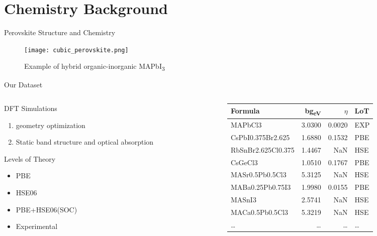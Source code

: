 \documentclass[10pt, compress]{beamer}
\begin{document}
\section{Chemistry Background}
\label{sec:org67eb681}
\begin{frame}[label={sec:orgc23004d}]{Perovskite Structure and Chemistry}
\begin{figure}[htbp]
\centering
\texttt{[image: cubic\_perovskite.png]}
\caption{Example of hybrid organic-inorganic MAPbI\textsubscript{3} \cite{mannodi-kanakkithodi-2022-data-driven}}
\end{figure}
\end{frame}
\begin{frame}[label={sec:org16cacb2}]{Our Dataset}
\begin{columns}
\begin{column}{0.35\columnwidth}
\begin{block}{DFT Simulations}
\begin{enumerate}
\item geometry optimization
\item Static band structure and optical absorption
\end{enumerate}
\end{block}
\begin{block}{Levels of Theory}
\begin{itemize}
\item PBE
\item HSE06
\item PBE+HSE06(SOC)
\item Experimental
\end{itemize}
\end{block}
\end{column}
\begin{column}{0.65\columnwidth}
\begin{center}
\begin{tabular}{lrrl}
Formula & bg\textsubscript{eV} & \(\eta\) & LoT\\
\hline
MAPbCl3 & 3.0300 & 0.0020 & EXP\\
CsPbI0.375Br2.625 & 1.6880 & 0.1532 & PBE\\
RbSnBr2.625Cl0.375 & 1.4467 & NaN & HSE\\
CsGeCl3 & 1.0510 & 0.1767 & PBE\\
MASr0.5Pb0.5Cl3 & 5.3125 & NaN & HSE\\
MABa0.25Pb0.75I3 & 1.9980 & 0.0155 & PBE\\
MASnI3 & 2.5741 & NaN & HSE\\
MACa0.5Pb0.5Cl3 & 5.3219 & NaN & HSE\\
\ldots{} & \ldots{} & \ldots{} & \ldots{}\\
\end{tabular}
\end{center}
\end{column}
\end{columns}
\end{frame}
\end{document}
